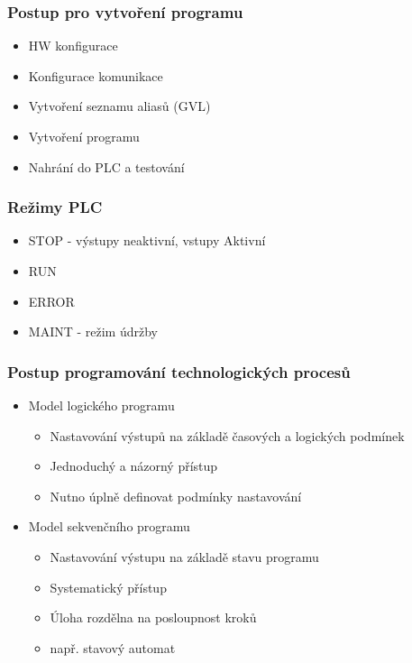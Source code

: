 \subsubsection*{Postup pro vytvoření programu}
\begin{itemize}
    \item HW konfigurace
    \item Konfigurace komunikace
    \item Vytvoření seznamu aliasů (GVL)
    \item Vytvoření programu
    \item Nahrání do PLC a testování
\end{itemize}

\subsubsection*{Režimy PLC}
\begin{itemize}
    \item STOP - výstupy neaktivní, vstupy Aktivní
    \item RUN
    \item ERROR
    \item MAINT - režim údržby
\end{itemize}

\subsubsection*{Postup programování technologických procesů}
\begin{itemize}
    \item Model logického programu \begin{itemize}
              \item Nastavování výstupů na základě časových a logických podmínek
              \item Jednoduchý a názorný přístup
              \item Nutno úplně definovat podmínky nastavování
          \end{itemize}
    \item Model sekvenčního programu \begin{itemize}
              \item Nastavování výstupu na základě stavu programu
              \item Systematický přístup
              \item Úloha rozdělna na posloupnost kroků
              \item např. stavový automat
          \end{itemize}
\end{itemize}

